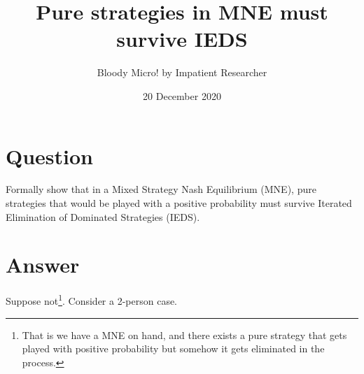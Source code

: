 \documentclass{tufte-handout}
\title{Pure strategies in MNE must survive IEDS}
\author{Bloody Micro! by Impatient Researcher}
\date{20 December 2020}  %
\begin{document}
\maketitle%


\section{Question}\label{sec:question}

Formally show that in a Mixed Strategy Nash Equilibrium (MNE), pure strategies that would be played with a positive probability must survive Iterated Elimination of Dominated Strategies (IEDS).

\section{Answer}\label{sec:answer}

Suppose not\footnote{That is we have a MNE on hand, and there exists a pure strategy that gets played with positive probability but somehow it gets eliminated in the process.}. Consider a 2-person case. 
\end{document}
